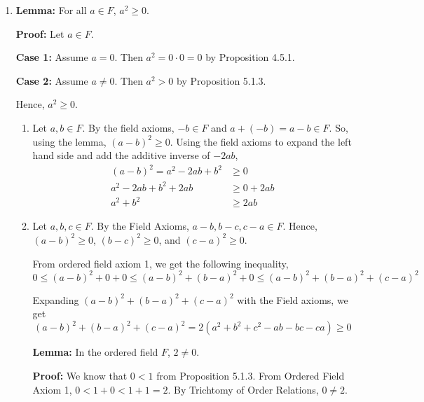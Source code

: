 \documentclass[12pt]{article}
\begin{document}

\begin{enumerate}[start=1,label={\bfseries Problem \arabic*:},leftmargin=1in] %
    \item \textbf{Lemma:} For all $a \in F$, $a^{2} \geq 0$. 
    
    \textbf{Proof:} Let $a \in F$.

    \textbf{Case 1:} Assume $a = 0$. Then $a^{2} = 0 \cdot 0 = 0$ by Proposition 4.5.1. 

    \textbf{Case 2:} Assume $a \neq 0$. Then $a^{2} > 0$ by Proposition 5.1.3. 
    
    Hence, $a^{2} \geq 0$. 

    \begin{enumerate}
        \item Let $a, b\in F$. By the field axioms, $-b \in F$ and $a + (-b) = a - b \in F$. So, 
        using the lemma, $(a - b)^{2} \geq 0$. Using the field axioms to expand the left hand side and add the additive inverse of $-2ab$,
        \begin{align*}
            (a-b)^{2} = a^{2} -2ab +b^{2} &\geq 0\\ 
            a^2 -2ab + b^{2} + 2ab &\geq 0 + 2ab \\ 
            a^{2} + b^{2} &\geq 2ab
        \end{align*}
        \item Let $a, b, c \in F$. By the Field Axioms, $a-b, b-c, c-a \in F$. 
        Hence, $(a-b)^{2} \geq 0$, $(b-c)^{2} \geq 0$, and $(c-a)^{2} \geq 0$.

        From ordered field axiom 1, we get the following inequality, 
        \[
            0 \leq (a-b)^{2} + 0 + 0 \leq (a-b)^{2} + (b-a)^{2} + 0 \leq (a-b)^{2} + (b-a)^{2} + (c-a)^{2}
        \]

        Expanding $(a-b)^{2} + (b-a)^{2} + (c-a)^{2}$ with the Field axioms, we get 
        \[
            (a-b)^{2} + (b-a)^{2} + (c-a)^{2} = 2(a^{2}+b^{2}+c^{2} - ab - bc - ca) \geq 0
        \]

        \textbf{Lemma:} In the ordered field $F$, $2 \neq 0$. 

        \textbf{Proof:} We know that $0 < 1$ from Proposition 5.1.3. From Ordered Field Axiom 1, $0 < 1 + 0 < 1 + 1 = 2$. 
        By Trichtomy of Order Relations, $0 \neq 2$. 


\end{enumerate}
\end{enumerate}
\end{document}

